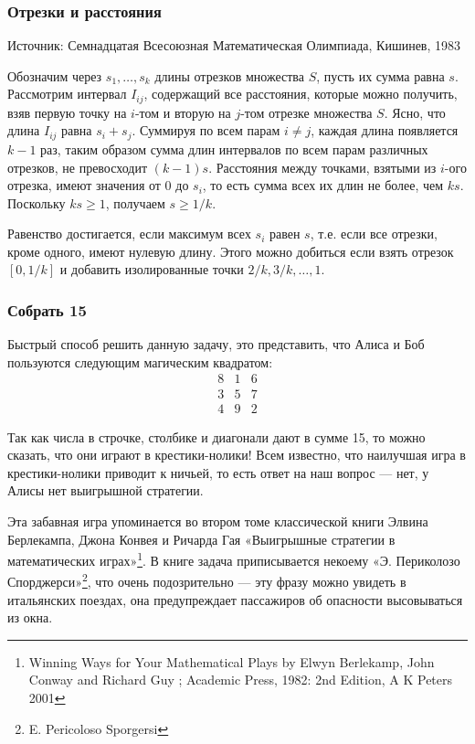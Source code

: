 \subsubsection*{Отрезки и расстояния} %


Источник:  Семнадцатая Всесоюзная Математическая Олимпиада,  Кишинев, 1983


Обозначим через $s_1,\dots,s_k$ длины отрезков множества $S$,
пусть их сумма равна $s$.
Рассмотрим интервал $I_{ij}$, содержащий все расстояния, которые можно получить, взяв первую точку на $i$-том  и вторую на $j$-том  отрезке множества $S$. 
Ясно, что  длина  $I_{ij}$ равна $s_i+s_j$. 
Суммируя по всем парам $i\ne j$, 
каждая длина  появляется $k-1$ раз,
таким образом сумма длин интервалов по всем парам различных отрезков,  не превосходит $(k-1) s$.
Расстояния между точками, взятыми из $i$-ого отрезка, имеют значения от $0$ до $s_i$, то есть сумма всех их длин не более, чем $k s$.
Поскольку $k s\ge 1$, получаем $s\ge 1/k$. \heart


Равенство достигается, если максимум всех $s_i$ равен $s$, 
т.е. если все отрезки, кроме одного, имеют нулевую длину. 
Этого можно добиться если взять отрезок $[0,1/k]$ и добавить изолированные точки
$2/k,3/k,\dots,1$.



\subsubsection*{Собрать 15} %



Быстрый способ решить данную задачу,  это представить, что Алиса и Боб пользуются следующим магическим квадратом:
$$
\begin{matrix}
8&1&6\\
3&5&7\\
4&9&2
\end{matrix}
$$

Так как числа в строчке, столбике и диагонали дают в сумме 15, то можно сказать, что они играют в крестики-нолики!  
Всем известно, что наилучшая игра в крестики-нолики приводит к ничьей,
то есть ответ на наш вопрос --- нет, у Алисы нет выигрышной стратегии.


Эта забавная игра упоминается во втором томе классической книги Элвина Берлекампа,  Джона Конвея и Ричарда Гая  «Выигрышные стратегии в математических играх»\footnote{Winning Ways for Your Mathematical Plays  by Elwyn Berlekamp, John Conway and Richard Guy ;   Academic Press, 1982: 2nd Edition, A K Peters 2001}. В книге  задача приписывается некоему «Э. Периколозо Спорджерси»\footnote{E. Pericoloso Sporgersi}, что очень подозрительно ---
эту фразу можно увидеть в итальянских поездах, она предупреждает пассажиров об опасности высовываться из окна.